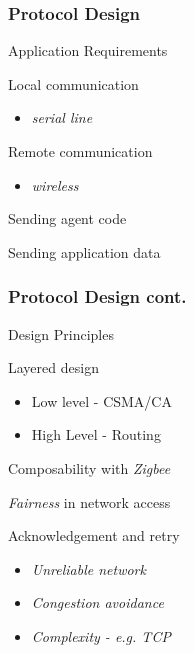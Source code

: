 \documentclass{beamer}
\theoremstyle{definition} \newtheorem{mdefinition}{Definition}
\theoremstyle{plain} \newtheorem{mtheorem}{Theorem}
\theoremstyle{plain} \newtheorem{mcorollary}{Corollary}
\theoremstyle{plain} \newtheorem{mfact}{Fact}
\begin{document}
\begin{frame}
  \frametitle{Protocol Design}
    \begin{block}{Application Requirements}
      \begin{description}
        
      \item Local communication \\
        \begin{itemize}
          \item \emph{serial line}
        \end{itemize}
      \item Remote communication
        \begin{itemize}
          \item \emph{wireless}
        \end{itemize}
      \item Sending agent code
      \item Sending application data

      \end{description}
    \end{block}
\end{frame}
\begin{frame}
  \frametitle{Protocol Design cont.}
    \begin{block}{Design Principles}
      \begin{description}
      \item Layered design
        \begin{itemize}
          \item Low level - CSMA/CA
          \item High Level - Routing
        \end{itemize}
      \item Composability with \emph{Zigbee} 
      \item \emph{Fairness} in network access 
      \item Acknowledgement and retry  
        \begin{itemize}
        \item \emph{Unreliable network}
        \item \emph{Congestion avoidance}
        \item \emph{Complexity - e.g. TCP}
        \end{itemize}
        
      \end{description}
    \end{block}
\end{frame}
\end{document}
